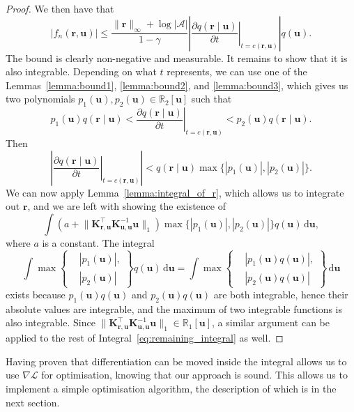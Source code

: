 \documentclass{mpaper}
\newcommand{\vbound}{\frac{\rinf + \log|\mathcal{A}|}{1 - \gamma}}
\newcommand{\rinf}{\lVert \mathbf{r} \rVert_\infty}
\newcommand{\fn}{f_n(\mathbf{r}, \mathbf{u})}
\newcommand{\Kuu}{\mathbf{K}_{\mathbf{u},\mathbf{u}}}
\newcommand{\Kru}{\mathbf{K}_{\mathbf{r},\mathbf{u}}}
\begin{document}
\begin{proof}
  We then have that
  \[
    |\fn| \le \vbound \left| \left. \frac{\partial
          q(\mathbf{r} \mid \mathbf{u})}{\partial t} \right|_{t=c(\mathbf{r}, \mathbf{u})}
    \right| q(\mathbf{u}).
  \]
  The bound is clearly non-negative and measurable. It remains to show that it
  is also integrable. Depending on what $t$ represents, we can use one of the
  Lemmas~\ref{lemma:bound1}, \ref{lemma:bound2}, and \ref{lemma:bound3}, which
  gives us two polynomials $p_1(\mathbf{u}), p_2(\mathbf{u}) \in
  \mathbb{R}_2[\mathbf{u}]$ such that
  \[
    p_1(\mathbf{u})q(\mathbf{r} \mid \mathbf{u}) < \left. \frac{\partial q(\mathbf{r} \mid \mathbf{u})}{\partial
        t} \right|_{t=c(\mathbf{r}, \mathbf{u})} < p_2(\mathbf{u})q(\mathbf{r} \mid \mathbf{u}).
  \]
  Then
  \[
    \left| \left. \frac{\partial q(\mathbf{r} \mid \mathbf{u})}{\partial t}
      \right|_{t=c(\mathbf{r}, \mathbf{u})} \right| < q(\mathbf{r} \mid \mathbf{u}) \max \{
    |p_1(\mathbf{u})|, |p_2(\mathbf{u})| \}.
  \]
  We can now apply Lemma~\ref{lemma:integral_of_r}, which allows us to integrate
  out $\mathbf{r}$, and we are left with showing the existence of
  \begin{equation} \label{eq:remaining_integral}
    \int \left( a + \lVert \Kru^\intercal \Kuu^{-1} \mathbf{u} \rVert_1 \right) \max \{|p_1(\mathbf{u})|, |p_2(\mathbf{u})| \} q(\mathbf{u})\,\mathrm{d}\mathbf{u},
  \end{equation}
  where $a$ is a constant. The integral
  \[
    \int \max \left\{
      \begin{aligned}
        &|p_1(\mathbf{u})|, \\
        &|p_2(\mathbf{u})|
      \end{aligned}
    \right\} q(\mathbf{u})\,\mathrm{d}\mathbf{u} = \int \max \left\{
      \begin{aligned}
        &|p_1(\mathbf{u})q(\mathbf{u})|, \\
        &|p_2(\mathbf{u})q(\mathbf{u})|
      \end{aligned}
    \right\}\,\mathrm{d}\mathbf{u}
  \]
  exists because $p_1(\mathbf{u})q(\mathbf{u})$ and
  $p_2(\mathbf{u})q(\mathbf{u})$ are both integrable, hence their absolute
  values are integrable, and the maximum of two integrable functions is also
  integrable. Since $\lVert \Kru^\intercal \Kuu^{-1} \mathbf{u} \rVert_1 \in
  \mathbb{R}_1[\mathbf{u}]$, a similar argument can be applied to the rest of
  Integral~\eqref{eq:remaining_integral} as well.
\end{proof}

Having proven that differentiation can be moved inside the integral allows us to
use $\nabla\mathcal{L}$ for optimisation, knowing that our approach is sound.
This allows us to implement a simple optimisation algorithm, the description of
which is in the next section.
\end{document}
